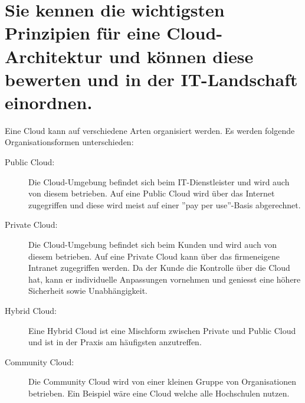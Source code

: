 \section{Sie kennen die wichtigsten Prinzipien für eine Cloud-Architektur und können diese bewerten und in der IT-Landschaft einordnen.}

Eine Cloud kann auf verschiedene Arten organisiert werden. Es werden folgende Organisationsformen unterschieden:
\begin{description}
	\item[Public Cloud:] Die Cloud-Umgebung befindet sich beim IT-Dienstleister und wird auch von diesem betrieben. Auf eine Public Cloud wird über das Internet zugegriffen und diese wird meist auf einer ''pay per use''-Basis abgerechnet.
	\item[Private Cloud:] Die Cloud-Umgebung befindet sich beim Kunden und wird auch von diesem betrieben. Auf eine Private Cloud kann über das firmeneigene Intranet zugegriffen werden. Da der Kunde die Kontrolle über die Cloud hat, kann er individuelle Anpassungen vornehmen und geniesst eine höhere Sicherheit sowie Unabhängigkeit.
	\item[Hybrid Cloud:] Eine Hybrid Cloud ist eine Mischform zwischen Private und Public Cloud und ist in der Praxis am häufigsten anzutreffen.
	\item[Community Cloud:] Die Community Cloud wird von einer kleinen Gruppe von Organisationen betrieben. Ein Beispiel wäre eine Cloud welche alle Hochschulen nutzen.
\end{description}

